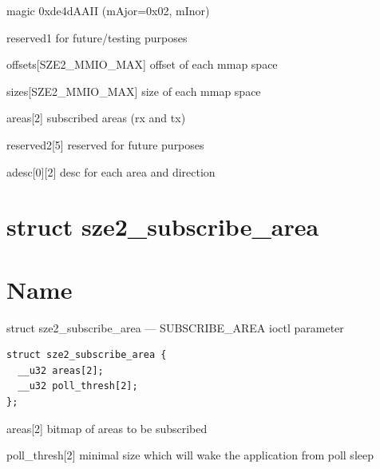 \begin{kdocdescription}
\item[{magic}]
0xde4dAAII (mAjor=0x02, mInor)
\item[{reserved1}]
for future/testing purposes
\item[{offsets[SZE2\_MMIO\_MAX]}]
offset of each mmap space
\item[{sizes[SZE2\_MMIO\_MAX]}]
size of each mmap space
\item[{areas[2]}]
subscribed areas (rx and tx)
\item[{reserved2[5]}]
reserved for future purposes
\item[{adesc[0][2]}]
desc for each area and direction
\end{kdocdescription}
\noindent %
\section*{struct sze2\_subscribe\_area}
\label{API-struct-sze2-subscribe-area}\hypertarget{API-struct-sze2-subscribe-area}{}%
\label{id206526}

\section*{Name}
struct sze2\_subscribe\_area --- SUBSCRIBE\_AREA ioctl parameter\label{id206536}

\begin{Verbatim}[]
struct sze2_subscribe_area {
  __u32 areas[2];
  __u32 poll_thresh[2];
};  
\end{Verbatim}

\label{id206548}

\begin{kdocdescription}
\item[{areas[2]}]
bitmap of areas to be subscribed
\item[{poll\_thresh[2]}]
minimal size which will wake the application from poll sleep
\end{kdocdescription}
\noindent 
{}
\label{id206580}

